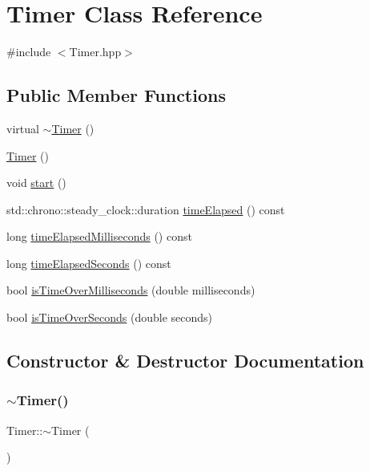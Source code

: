 \hypertarget{class_timer}{}\section{Timer Class Reference}
\label{class_timer}


{\ttfamily \#include $<$Timer.\+hpp$>$}

\subsection*{Public Member Functions}
\begin{DoxyCompactItemize}
\item 
virtual \hyperlink{class_timer_a14fa469c4c295c5fa6e66a4ad1092146}{$\sim$\+Timer} ()
\item 
\hyperlink{class_timer_a5f16e8da27d2a5a5242dead46de05d97}{Timer} ()
\item 
void \hyperlink{class_timer_a3a8b5272198d029779dc9302a54305a8}{start} ()
\item 
std\+::chrono\+::steady\+\_\+clock\+::duration \hyperlink{class_timer_a2ddb5fe1533752992785fb06e86b7c07}{time\+Elapsed} () const
\item 
long \hyperlink{class_timer_aee5dbd672b676eed86a5594f7072719e}{time\+Elapsed\+Milliseconds} () const
\item 
long \hyperlink{class_timer_ad15a9b6eff0680b58675e52a3959cb1d}{time\+Elapsed\+Seconds} () const
\item 
bool \hyperlink{class_timer_ab12a809d6520150d9eeec6b5f5511854}{is\+Time\+Over\+Milliseconds} (double milliseconds)
\item 
bool \hyperlink{class_timer_a99830a54e401b61cdf0777940f6e36e7}{is\+Time\+Over\+Seconds} (double seconds)
\end{DoxyCompactItemize}


\subsection{Constructor \& Destructor Documentation}
\mbox{\label{class_timer_a14fa469c4c295c5fa6e66a4ad1092146}} 
\subsubsection{\texorpdfstring{$\sim$\+Timer()}{~Timer()}}
{\footnotesize\ttfamily Timer\+::$\sim$\+Timer (\begin{DoxyParamCaption}{ }\end{DoxyParamCaption})\hspace{0.3cm}{\ttfamily [virtual]}}

